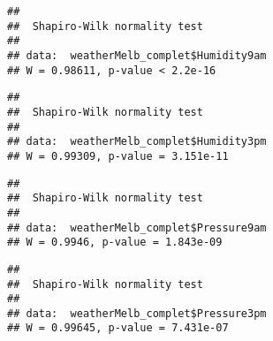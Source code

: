 \documentclass[
]{article}
\newenvironment{Shaded}{\begin{snugshade}}{\end{snugshade}}
\newcommand{\KeywordTok}[1]{\textcolor[rgb]{0.13,0.29,0.53}{\textbf{#1}}}
\newcommand{\NormalTok}[1]{#1}
\newcommand{\OperatorTok}[1]{\textcolor[rgb]{0.81,0.36,0.00}{\textbf{#1}}}
\begin{document}
\begin{Shaded}
\end{Shaded}

\begin{verbatim}
## 
##  Shapiro-Wilk normality test
## 
## data:  weatherMelb_complet$Humidity9am
## W = 0.98611, p-value < 2.2e-16
\end{verbatim}

\begin{Shaded}
\end{Shaded}

\begin{verbatim}
## 
##  Shapiro-Wilk normality test
## 
## data:  weatherMelb_complet$Humidity3pm
## W = 0.99309, p-value = 3.151e-11
\end{verbatim}

\begin{Shaded}
\end{Shaded}

\begin{verbatim}
## 
##  Shapiro-Wilk normality test
## 
## data:  weatherMelb_complet$Pressure9am
## W = 0.9946, p-value = 1.843e-09
\end{verbatim}

\begin{Shaded}
\end{Shaded}

\begin{verbatim}
## 
##  Shapiro-Wilk normality test
## 
## data:  weatherMelb_complet$Pressure3pm
## W = 0.99645, p-value = 7.431e-07
\end{verbatim}

\begin{Shaded}
\end{Shaded}
\end{document}
